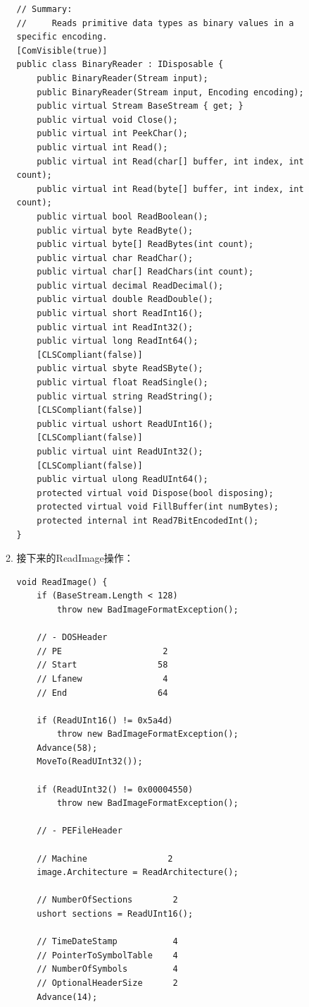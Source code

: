\documentclass[9pt, b5paper]{article}
\begin{document}
\begin{enumerate}
\begin{enumerate}
\begin{verbatim}
// Summary:
//     Reads primitive data types as binary values in a specific encoding.
[ComVisible(true)]
public class BinaryReader : IDisposable {
    public BinaryReader(Stream input);
    public BinaryReader(Stream input, Encoding encoding);
    public virtual Stream BaseStream { get; }
    public virtual void Close();
    public virtual int PeekChar();
    public virtual int Read();
    public virtual int Read(char[] buffer, int index, int count);
    public virtual int Read(byte[] buffer, int index, int count);
    public virtual bool ReadBoolean();
    public virtual byte ReadByte();
    public virtual byte[] ReadBytes(int count);
    public virtual char ReadChar();
    public virtual char[] ReadChars(int count);
    public virtual decimal ReadDecimal();
    public virtual double ReadDouble();
    public virtual short ReadInt16();
    public virtual int ReadInt32();
    public virtual long ReadInt64();
    [CLSCompliant(false)]
    public virtual sbyte ReadSByte();
    public virtual float ReadSingle();
    public virtual string ReadString();
    [CLSCompliant(false)]
    public virtual ushort ReadUInt16();
    [CLSCompliant(false)]
    public virtual uint ReadUInt32();
    [CLSCompliant(false)]
    public virtual ulong ReadUInt64();
    protected virtual void Dispose(bool disposing);
    protected virtual void FillBuffer(int numBytes);
    protected internal int Read7BitEncodedInt();
}
\end{verbatim}
\item 接下来的ReadImage操作：
\label{sec-9-1-3-1-2}
\begin{verbatim}
void ReadImage() {
    if (BaseStream.Length < 128)
        throw new BadImageFormatException();

    // - DOSHeader
    // PE                    2
    // Start                58
    // Lfanew                4
    // End                  64

    if (ReadUInt16() != 0x5a4d)
        throw new BadImageFormatException();
    Advance(58);
    MoveTo(ReadUInt32());

    if (ReadUInt32() != 0x00004550)
        throw new BadImageFormatException();

    // - PEFileHeader

    // Machine                2
    image.Architecture = ReadArchitecture();

    // NumberOfSections        2
    ushort sections = ReadUInt16();

    // TimeDateStamp           4
    // PointerToSymbolTable    4
    // NumberOfSymbols         4
    // OptionalHeaderSize      2
    Advance(14);


\end{verbatim}
\end{enumerate}
\end{enumerate}
\end{document}
